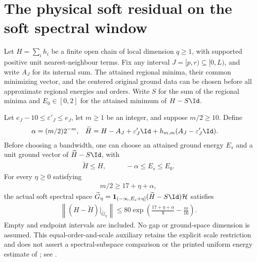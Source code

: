 \section{The physical soft residual on the soft spectral window}

\begin{lemma}
    \label{thm:interval_physical_soft_reverse_residual}
    \leanok
    Let $H=\sum_i h_i$ be a finite open chain of local dimension $q\ge1$,
    with supported positive unit nearest-neighbour terms. Fix any interval
    $J=[p,r)\subseteq[0,L)$, and write $A_J$ for its internal sum.
    The attained regional minima, their common minimizing vector, and the
    centered original ground data can be chosen before all approximate
    regional energies and orders. Write $S$ for the sum of the regional
    minima and $E_0\in[0,2]$ for the attained minimum of $H-S\Id$.

    Let $e_J-10\le\varepsilon'_J\le e_J$, let $m\ge1$ be an integer, and
    suppose $m/2\ge10$. Define
    \begin{align*}
        \alpha       & =(m/2)2^{-m},            &
        \widetilde H & =H-A_J+\varepsilon'_J\Id
        +h_{m,m}(A_J-\varepsilon'_J\Id).
    \end{align*}
    Before choosing a bandwidth, one can choose an attained ground energy
    $E_s$ and a unit ground vector of $\widetilde H-S\Id$, with
    \begin{align*}
        \widetilde H\le H, & \qquad -\alpha\le E_s\le E_0.
    \end{align*}
    For every $\eta\ge0$ satisfying
    \begin{align}
        m/2\ge17+\eta+\alpha,
        \label{eq:physical_soft_reverse_scale}
    \end{align}
    the actual soft spectral space
    $\widetilde G_\eta=\mathbf1_{(-\infty,E_s+\eta]}
        (\widetilde H-S\Id)\mathcal H$ satisfies
    \begin{align}
        \left\|(H-\widetilde H)|_{\widetilde G_\eta}\right\|
        \le80\exp\left(\frac{17+\eta+\alpha}{8}-\frac m{16}\right).
        \label{eq:physical_soft_reverse_residual}
    \end{align}
    Empty and endpoint intervals are included. No gap or ground-space
    dimension is assumed. This equal-order-and-scale auxiliary retains
    the explicit scale restriction and does not assert a spectral-subspace
    comparison or the printed uniform energy estimate of
    \cite{Arad2016RigorousRG}; see
    \cite{gap:alvv16_soft_truncation_energy_estimate}.
\end{lemma}
